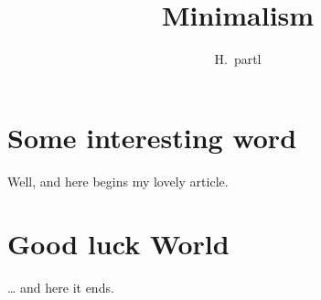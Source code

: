 \documentclass[a4paper,11pt]{article}
\author{H.~partl}
\title{Minimalism}
\begin{document}
\maketitle
\tableofcontents
\section{Some interesting word}
Well, and here begins my lovely article.
\section{Good luck World}
\ldots{} and here it ends.
\end{document}
